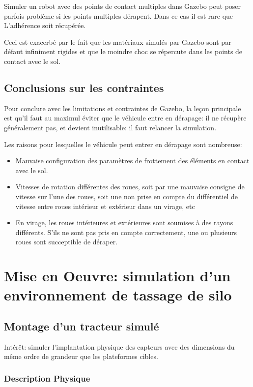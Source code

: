 \documentclass[12pt,a4paper]{report}
\begin{document}
		Simuler un robot avec des points de contact multiples dans Gazebo peut poser parfois problème si les points multiples dérapent. Dans ce cas il est rare que L'adhérence soit récupérée.
		
		\para Ceci est exacerbé par le fait que les matériaux simulés par Gazebo sont par défaut infiniment rigides et que le moindre choc se répercute dans les points de contact avec le sol. 

		
		\subsection{Conclusions sur les contraintes}
		\label{conc-contrainte-gazebo}
		Pour conclure avec les limitations et contraintes de Gazebo, la leçon principale est qu'il faut au maximul éviter que le véhicule entre en dérapage: il ne récupère généralement pas, et devient inutilisable: il faut relancer la simulation.
		
		\para Les raisons pour lesquelles le véhicule peut entrer en dérapage sont nombreuse:
		\begin{itemize}
			\item Mauvaise configuration des paramètres de frottement des éléments en contact avec le sol.
			\item  Vitesses de rotation différentes des roues, soit par une mauvaise consigne de vitesse sur l'une des roues, soit une non prise en compte du différentiel de vitesse entre roues intérieur et extérieur dans un virage, etc
			
			\item En virage, les roues intérieures et extérieures sont soumises à des rayons différents. S'ils ne sont pas pris en compte correctement, une ou plusieurs roues sont succeptible de déraper.
		\end{itemize}

		
	\section{Mise en Oeuvre: simulation d'un environnement de tassage de silo}
		\subsection{Montage d'un tracteur simulé}
		Intérêt: simuler l'implantation physique des capteurs avec des dimensions du même ordre de grandeur que les plateformes cibles.
		
		\subsubsection{Description Physique}
\end{document}
